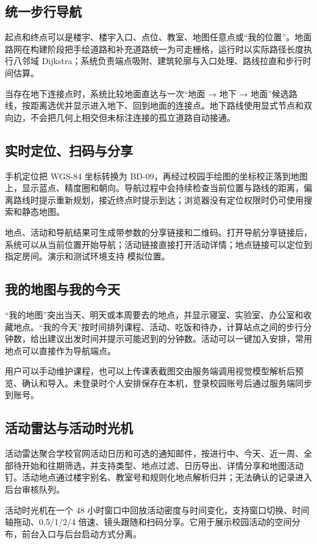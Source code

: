 \documentclass[UTF8,a4paper,12pt]{ctexart}
\begin{document}
\subsection{统一步行导航}
起点和终点可以是楼宇、楼宇入口、点位、教室、地图任意点或“我的位置”。地面路网在构建阶段把手绘道路和补充道路统一为可走栅格，运行时以实际路径长度执行八邻域 Dijkstra；系统负责端点吸附、建筑轮廓与入口处理、路线拉直和步行时间估算。\par
当存在地下连接点时，系统比较地面直达与一次“地面 → 地下 → 地面”候选路线，按距离选优并显示进入地下、回到地面的连接点。地下路线使用显式节点和双向边，不会把几何上相交但未标注连接的孤立道路自动接通。\par
\subsection{实时定位、扫码与分享}
手机定位把 WGS-84 坐标转换为 BD-09，再经过校园手绘图的坐标校正落到地图上，显示蓝点、精度圈和朝向。导航过程中会持续检查当前位置与路线的距离，偏离路线时提示重新规划，接近终点时提示到达；浏览器没有定位权限时仍可使用搜索和静态地图。\par
地点、活动和导航结果可生成带参数的分享链接和二维码。打开导航分享链接后，系统可以从当前位置开始导航；活动链接直接打开活动详情；地点链接可以定位到指定房间。演示和测试环境支持 \texttt{} 模拟位置。\par
\subsection{我的地图与我的今天}
“我的地图”突出当天、明天或本周要去的地点，并显示寝室、实验室、办公室和收藏地点。“我的今天”按时间排列课程、活动、吃饭和待办，计算站点之间的步行分钟数，给出建议出发时间并提示可能迟到的分钟数。活动可以一键加入安排，常用地点可以直接作为导航端点。\par
用户可以手动维护课程，也可以上传课表截图交由服务端调用视觉模型解析后预览、确认和导入。未登录时个人安排保存在本机，登录校园账号后通过服务端同步到账号。\par
\subsection{活动雷达与活动时光机}
活动雷达聚合学校官网活动日历和可选的通知邮件，按进行中、今天、近一周、全部待开始和往期筛选，并支持类型、地点过滤、日历导出、详情分享和地图活动钉。活动地点通过楼宇别名、教室号和规则化地点解析归并；无法确认的记录进入后台审核队列。\par
活动时光机在一个 48 小时窗口中回放活动密度与时间变化，支持窗口切换、时间轴拖动、0.5/1/2/4 倍速、镜头跟随和扫码分享。它用于展示校园活动的空间分布，前台入口与后台启动方式分离。\par
\end{document}
